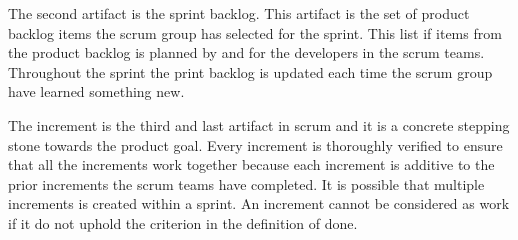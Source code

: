 The second artifact is the sprint backlog. 
This artifact is the set of product backlog items the scrum group has selected for the sprint. 
This list if items from the product backlog is planned by and for the developers in the scrum teams. 
Throughout the sprint the print backlog is updated each time the scrum group have learned something new. \cite{schwaber_sutherland_2022}

The increment is the third and last artifact in scrum and it is a concrete stepping stone towards the product goal.
Every increment is thoroughly verified to ensure that all the increments work together because each increment is additive to the prior increments the scrum teams have completed.
It is possible that multiple increments is created within a sprint.
An increment cannot be considered as work if it do not uphold the criterion in the definition of done. \cite{schwaber_sutherland_2022}
